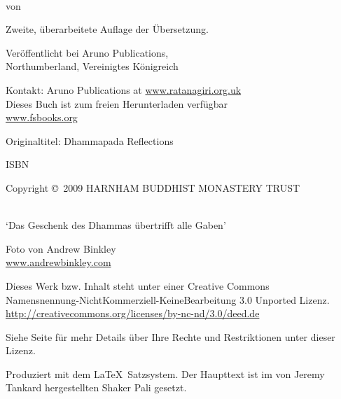 \cleartoverso
\thispagestyle{empty}
\enlargethispage{\baselineskip}

{\copyrightsize\setlength{\parskip}{0.5\baselineskip}\setlength{\parindent}{0em}%
\raggedright%
\shaker\color[gray]{0.3}

\thetitle\\
von \theauthor

Zweite, überarbeitete Auflage der Übersetzung.

Veröffentlicht bei Aruno Publications,\\
Northumberland, Vereinigtes Königreich

Kontakt: Aruno Publications at \href{http://ratanagiri.org.uk/}{www.ratanagiri.org.uk}\\
Dieses Buch ist zum freien Herunterladen verfügbar\\
\href{http://fsbooks.org/}{www.fsbooks.org}

Originaltitel: Dhammapada Reflections

ISBN \theISBN

Copyright \copyright\ 2009 HARNHAM BUDDHIST MONASTERY TRUST

\\
`Das Geschenk des Dhammas übertrifft alle Gaben'

Foto von Andrew Binkley\\
\href{http://andrewbinkley.com}{www.andrewbinkley.com}

{\tiny
Dieses Werk bzw. Inhalt steht unter einer Creative Commons\\
Namensnennung-NichtKommerziell-KeineBearbeitung 3.0 Unported Lizenz.\\
\href{http://creativecommons.org/licenses/by-nc-nd/3.0/deed.de}{http://creativecommons.org/licenses/by-nc-nd/3.0/deed.de}

Siehe Seite \pageref{copyright-details} für mehr Details über Ihre Rechte und Restriktionen unter dieser Lizenz.

Produziert mit dem \LaTeX\ Satzsystem. Der Haupttext ist im von Jeremy Tankard hergestellten Shaker Pali gesetzt.

\theEditionInfo

}}

